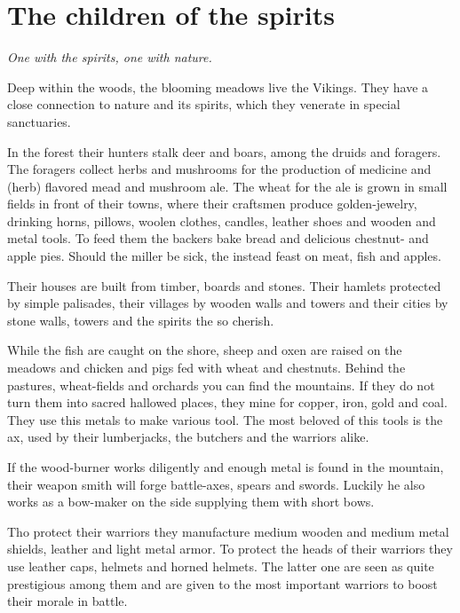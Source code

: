 \section{The children of the spirits}\label{ch:Tribes:Vikings}

\begin{flushright}
	\emph{One with the spirits, one with nature.}
\end{flushright}

Deep within the woods, the blooming meadows live the \gls*{Vikings}. They have
a close connection to nature and its spirits, which they venerate in special
sanctuaries.

In the forest their hunters stalk deer and boars, among the druids and
foragers. The foragers collect herbs and mushrooms for the production of
medicine and (herb) flavored mead and mushroom ale. The wheat for the ale is
grown in small fields in front of their towns, where their craftsmen produce
golden-jewelry, drinking horns, pillows, woolen clothes, candles, leather shoes
and wooden and metal tools. To feed them the backers bake bread and delicious
chestnut- and apple pies. Should the miller be sick, the instead feast on meat,
fish and apples.

Their houses are built from timber, boards and stones. Their hamlets protected
by simple palisades, their villages by wooden walls and towers and their cities
by stone walls, towers and the spirits the so cherish.

While the fish are caught on the shore, sheep and oxen are raised on the
meadows and chicken and pigs fed with wheat and chestnuts. Behind the pastures,
wheat-fields and orchards you can find the mountains. If they do not turn them
into sacred hallowed places, they mine for copper, iron, gold and coal. They
use this metals to make various tool. The most beloved of this tools is the ax,
used by their lumberjacks, the butchers and the warriors alike.

If the wood-burner works diligently and enough metal is found in the mountain,
their weapon smith will forge battle-axes, spears and swords. Luckily he also
works as a bow-maker on the side supplying them with short bows.

Tho protect their warriors they manufacture medium wooden and medium metal
shields, leather and light metal armor. To protect the heads of their warriors
they use leather caps, helmets and horned helmets. The latter one are seen as
quite prestigious among them and are given to the most important warriors to
boost their morale in battle.

